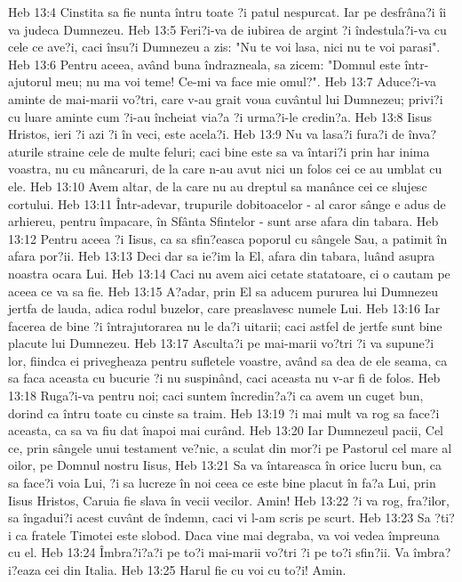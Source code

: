 Heb 13:4  Cinstita sa fie nunta întru toate ?i patul nespurcat. Iar pe desfrâna?i îi va judeca Dumnezeu.
Heb 13:5  Feri?i-va de iubirea de argint ?i îndestula?i-va cu cele ce ave?i, caci însu?i Dumnezeu a zis: "Nu te voi lasa, nici nu te voi parasi".
Heb 13:6  Pentru aceea, având buna îndrazneala, sa zicem: "Domnul este într-ajutorul meu; nu ma voi teme! Ce-mi va face mie omul?".
Heb 13:7  Aduce?i-va aminte de mai-marii vo?tri, care v-au grait voua cuvântul lui Dumnezeu; privi?i cu luare aminte cum ?i-au încheiat via?a ?i urma?i-le credin?a.
Heb 13:8  Iisus Hristos, ieri ?i azi ?i în veci, este acela?i.
Heb 13:9  Nu va lasa?i fura?i de înva?aturile straine cele de multe feluri; caci bine este sa va întari?i prin har inima voastra, nu cu mâncaruri, de la care n-au avut nici un folos cei ce au umblat cu ele.
Heb 13:10  Avem altar, de la care nu au dreptul sa manânce cei ce slujesc cortului.
Heb 13:11  Într-adevar, trupurile dobitoacelor - al caror sânge e adus de arhiereu, pentru împacare, în Sfânta Sfintelor - sunt arse afara din tabara.
Heb 13:12  Pentru aceea ?i Iisus, ca sa sfin?easca poporul cu sângele Sau, a patimit în afara por?ii.
Heb 13:13  Deci dar sa ie?im la El, afara din tabara, luând asupra noastra ocara Lui.
Heb 13:14  Caci nu avem aici cetate statatoare, ci o cautam pe aceea ce va sa fie.
Heb 13:15  A?adar, prin El sa aducem pururea lui Dumnezeu jertfa de lauda, adica rodul buzelor, care preaslavesc numele Lui.
Heb 13:16  Iar facerea de bine ?i întrajutorarea nu le da?i uitarii; caci astfel de jertfe sunt bine placute lui Dumnezeu.
Heb 13:17  Asculta?i pe mai-marii vo?tri ?i va supune?i lor, fiindca ei privegheaza pentru sufletele voastre, având sa dea de ele seama, ca sa faca aceasta cu bucurie ?i nu suspinând, caci aceasta nu v-ar fi de folos.
Heb 13:18  Ruga?i-va pentru noi; caci suntem încredin?a?i ca avem un cuget bun, dorind ca întru toate cu cinste sa traim.
Heb 13:19  ?i mai mult va rog sa face?i aceasta, ca sa va fiu dat înapoi mai curând.
Heb 13:20  Iar Dumnezeul pacii, Cel ce, prin sângele unui testament ve?nic, a sculat din mor?i pe Pastorul cel mare al oilor, pe Domnul nostru Iisus,
Heb 13:21  Sa va întareasca în orice lucru bun, ca sa face?i voia Lui, ?i sa lucreze în noi ceea ce este bine placut în fa?a Lui, prin Iisus Hristos, Caruia fie slava în vecii vecilor. Amin!
Heb 13:22  ?i va rog, fra?ilor, sa îngadui?i acest cuvânt de îndemn, caci vi l-am scris pe scurt.
Heb 13:23  Sa ?ti?i ca fratele Timotei este slobod. Daca vine mai degraba, va voi vedea împreuna cu el.
Heb 13:24  Îmbra?i?a?i pe to?i mai-marii vo?tri ?i pe to?i sfin?ii. Va îmbra?i?eaza cei din Italia.
Heb 13:25  Harul fie cu voi cu to?i! Amin.


